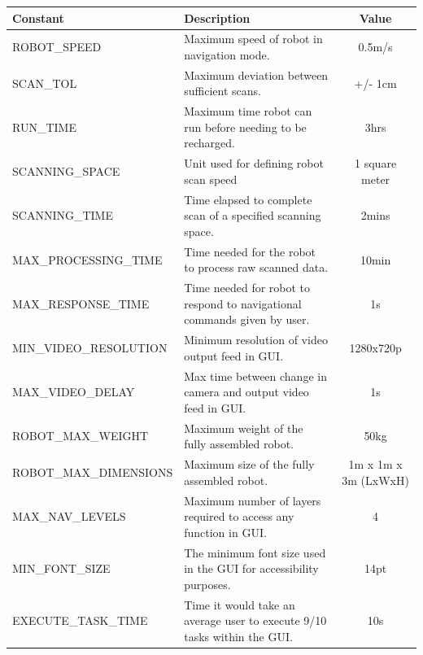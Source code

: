 \documentclass[12pt]{article}
\newcommand{\RobotSpeed}{0.5m/s}
\newcommand{\ScanTolerance}{+/- 1cm}
\newcommand{\BatteryLife}{3hrs}
\newcommand{\ScanningSpace}{1 square meter}
\newcommand{\ScanningTime}{2mins}
\newcommand{\MaxProcessingTime}{10min}
\newcommand{\MaxResponseTime}{1s}
\newcommand{\MinVideoResolution}{1280x720p}
\newcommand{\MaxVideoDelay}{1s}
\newcommand{\RobotMaxWeight}{50kg}
\newcommand{\RobotMaxDimensions}{1m x 1m x 3m (LxWxH)}
\newcommand{\MaxNavLevels}{4}
\newcommand{\MinFontSize}{14pt}
\newcommand{\ExecuteTaskTime}{10s}
\begin{document}
\begin{tabular}{ | l | p{6cm} | c |}
  \hline
  \textbf{Constant} & \textbf{Description} & \textbf{Value} \\
  \hline
  ROBOT\_SPEED & Maximum speed of robot in navigation mode. & \RobotSpeed{} \\
  \hline
  SCAN\_TOL & Maximum deviation between sufficient scans. & \ScanTolerance{} \\
  \hline
  RUN\_TIME & Maximum time robot can run before needing to be recharged. & \BatteryLife{} \\
  \hline
  SCANNING\_SPACE & Unit used for defining robot scan speed & \ScanningSpace{} \\
  \hline
  SCANNING\_TIME & Time elapsed to complete scan of a specified scanning space. & \ScanningTime{} \\
  \hline
  MAX\_PROCESSING\_TIME & Time needed for the robot to process raw scanned data. & \MaxProcessingTime{} \\
  \hline
  MAX\_RESPONSE\_TIME & Time needed for robot to respond to navigational commands given by user. & \MaxResponseTime{} \\
  \hline
  MIN\_VIDEO\_RESOLUTION & Minimum resolution of video output feed in GUI. & \MinVideoResolution{} \\
  \hline
  MAX\_VIDEO\_DELAY & Max time between change in camera and output video feed in GUI. & \MaxVideoDelay{} \\
  \hline
  ROBOT\_MAX\_WEIGHT & Maximum weight of the fully assembled robot. & \RobotMaxWeight{} \\
  \hline
  ROBOT\_MAX\_DIMENSIONS & Maximum size of the fully assembled robot. & \RobotMaxDimensions{} \\
  \hline
  MAX\_NAV\_LEVELS & Maximum number of layers required to access any function in GUI. & \MaxNavLevels{} \\
  \hline
  MIN\_FONT\_SIZE & The minimum font size used in the GUI for accessibility purposes. & \MinFontSize{} \\
  \hline
  EXECUTE\_TASK\_TIME & Time it would take an average user to execute 9/10 tasks within the GUI. & \ExecuteTaskTime{} \\
  \hline
  
\end{tabular}

\newpage
\nocite{*}


\end{document}
